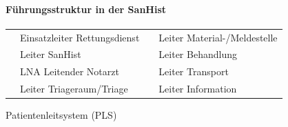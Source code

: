 \documentclass{article}
\begin{document}
\paragraph{F\"uhrungsstruktur in der SanHist}
\begin{center}
\tablehead{}\begin{supertabular}{m{2.4459999cm}m{4.0030003cm}m{2.299cm}m{4.1520004cm}}
 \par

 &
Einsatzleiter Rettungsdienst

 &
 \par

 &
Leiter Material-/Meldestelle

\\
 \par

 &
Leiter SanHist

 &
 \par

 &
Leiter Behandlung

\\
 \par

 &
LNA Leitender Notarzt

 &
 \par

 &
Leiter Transport

\\
 \par

 &
Leiter Triageraum/Triage

 &
 \par

 &
Leiter Information

\\
\end{supertabular}
\end{center}
Patientenleitsystem (PLS)
\end{document}

